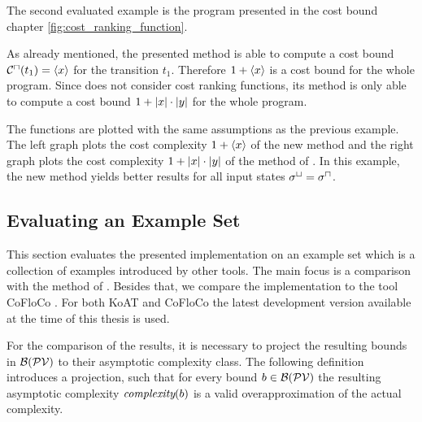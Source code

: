 The second evaluated example is the program presented in the cost bound chapter \ref{fig:cost_ranking_function}.

\iffalse\fi

As already mentioned, the presented method is able to compute a cost bound ${\mathcal{C}^\sqcap}(t_1) = \langle x\rangle$ for the transition $t_1$.
Therefore $1 + \langle x\rangle$ is a cost bound for the whole program.
Since \cite{koat} does not consider cost ranking functions, its method is only able to compute a cost bound $1 + \left|x\right| \cdot \left|y\right|$ for the whole program.

The functions are plotted with the same assumptions as the previous example.
The left graph plots the cost complexity $1 + \langle x\rangle$ of the new method and the right graph plots the cost complexity $1 + \left|x\right| \cdot \left|y\right|$ of the method of \cite{koat}.
In this example, the new method yields better results for all input states ${\sigma^\sqcup} = {\sigma^\sqcap}$.

\subsection{Evaluating an Example Set}

This section evaluates the presented implementation on an example set which is a collection of examples introduced by other tools.
The main focus is a comparison with the method of \cite{koat}.
Besides that, we compare the implementation to the tool CoFloCo \cite{cofloco3}.
For both KoAT and CoFloCo the latest development version available at the time of this thesis is used.

For the comparison of the results, it is necessary to project the resulting bounds in $\mathcal{B}(\mathcal{PV})$ to their asymptotic complexity class.
The following definition introduces a projection, such that for every bound $b \in \mathcal{B}(\mathcal{PV})$ the resulting asymptotic complexity $\emph{complexity}(b)$ is a valid overapproximation of the actual complexity.

